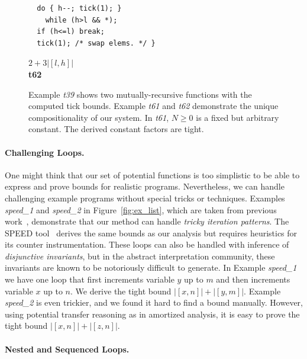 \documentclass[nocopyrightspace,preprint,pldi]{sigplanconf-pldi15}
\newcommand{\ifshort}[2]{\ifx\fullversion\undefined{#1}\else{#2}\fi}
\newcommand{\paraskip}[0]{\ifshort{\vspace{-4pt}}{}}
\begin{document}
\begin{figure}
\begin{minipage}[b]{5.5cm}
\begin{center}
\begin{lstlisting}
  do { h--; tick(1); }
    while (h>l && *);
  if (h<=l) break;
  tick(1); /* swap elems. */ }
\end{lstlisting}
$2+3|[l,h]|$
\\[.4\baselineskip]
      {\bf t62}
    \end{center}
  \end{minipage}
\vspace{1ex}
\caption{Example \emph{t39} shows two mutually-recursive functions
  with the computed tick bounds.  Example \emph{t61} and \emph{t62}
  demonstrate the unique compositionality of our system. In \emph{t61},
  $N\geq 0$ is a fixed but arbitrary constant.  The derived constant factors
  are tight.}
  \label{fig:ex_list_2}
\end{figure}



\paraskip
\paragraph{Challenging Loops.}

One might think that our set of potential functions is too simplistic
to be able to express and prove bounds for realistic
programs. Nevertheless, we can handle challenging example programs
without special tricks or techniques.  Examples \emph{speed\_1} and
\emph{speed\_2} in Figure~\ref{fig:ex_list}, which are taken from previous work~\cite{GulwaniMC09},
demonstrate that our method can handle \emph{tricky iteration
  patterns}.  The SPEED tool~\cite{GulwaniMC09} derives the same
bounds as our analysis but requires heuristics for its counter
instrumentation.  These loops can also be handled with inference of
\emph{disjunctive invariants}, but in the abstract interpretation
community, these invariants are known to be notoriously difficult to
generate.
%
In Example \emph{speed\_1} we have one loop that first increments
variable $y$ up to $m$ and then increments variable $x$ up to $n$.  We
derive the tight bound $|[x, n]| + |[y, m]|$.
%
Example \emph{speed\_2} is even trickier, and we found it hard to
find a bound manually.  However, using potential transfer reasoning as
in amortized analysis, it is easy to prove the tight bound
$|[x, n]| + |[z, n]|$.

\paraskip
\paragraph{Nested and Sequenced Loops.}
\end{document}
